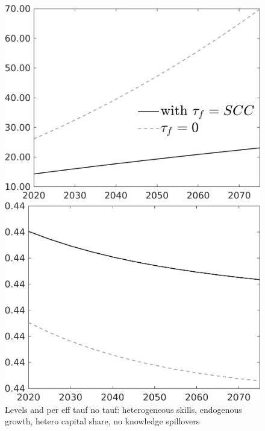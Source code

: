 \documentclass[12pt]{article}
\begin{document}
\begin{figure}[h!!]
	\centering
	\caption{Levels and per eff tauf no tauf: heterogeneous skills, endogenous growth, hetero capital share, no knowledge spillovers}\label{fig:Leveltauf_nsk0_xgr0_noknow_withtaul}
	\begin{minipage}[]{0.32\textwidth}
		\includegraphics[width=1\textwidth]{../../codding_model/own_basedOnFried/optimalPol_010922_revision/figures/all_13Sept22/LevTaufNoTauf_TaulCalib_regime0_Emnet_spillover0_nsk0_xgr0_knspil1_sep1_LFlimit0_emsbase0_countec0_GovRev0_etaa0.79_lgd1.png}
	\end{minipage}	
	\begin{minipage}[]{0.32\textwidth}
		\includegraphics[width=1\textwidth]{../../codding_model/own_basedOnFried/optimalPol_010922_revision/figures/all_13Sept22/LevTaufNoTauf_TaulCalib_regime0_hh_spillover0_nsk0_xgr0_knspil1_sep1_LFlimit0_emsbase0_countec0_GovRev0_etaa0.79_lgd0.png}

\end{minipage}
\end{figure}
\end{document}
